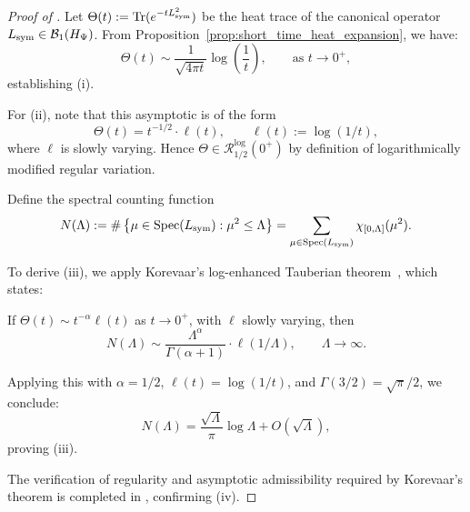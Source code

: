 \begin{proof}[Proof of ]
Let \( \Theta(t) := \operatorname{Tr}(e^{-t L_{\mathrm{sym}}^2}) \) be the heat trace of the canonical operator \( L_{\mathrm{sym}} \in \mathcal{B}_1(H_{\Psi}) \). From Proposition~\ref{prop:short_time_heat_expansion}, we have:
\[
\Theta(t) \sim \frac{1}{\sqrt{4\pi t}} \log\left( \frac{1}{t} \right), \qquad \text{as } t \to 0^+,
\]
establishing (i).

\medskip

For (ii), note that this asymptotic is of the form
\[
\Theta(t) = t^{-1/2} \cdot \ell(t), \qquad \ell(t) := \log(1/t),
\]
where \( \ell \) is slowly varying. Hence \( \Theta \in \mathcal{R}^{\log}_{1/2}(0^+) \) by definition of logarithmically modified regular variation.

\medskip

Define the spectral counting function
\[
N(\Lambda) := \#\left\{ \mu \in \operatorname{Spec}(L_{\mathrm{sym}}) : \mu^2 \le \Lambda \right\}
= \sum_{\mu \in \operatorname{Spec}(L_{\mathrm{sym}})} \chi_{[0, \Lambda]}(\mu^2).
\]

\medskip

To derive (iii), we apply Korevaar’s log-enhanced Tauberian theorem~\cite[Ch.~III, Thm. 5.1]{Korevaar2004Tauberian}, which states:

If \( \Theta(t) \sim t^{-\alpha} \ell(t) \) as \( t \to 0^+ \), with \( \ell \) slowly varying, then
\[
N(\Lambda) \sim \frac{\Lambda^\alpha}{\Gamma(\alpha + 1)} \cdot \ell(1/\Lambda), \qquad \Lambda \to \infty.
\]

\medskip

Applying this with \( \alpha = 1/2 \), \( \ell(t) = \log(1/t) \), and \( \Gamma(3/2) = \sqrt{\pi}/2 \), we conclude:
\[
N(\Lambda) = \frac{\sqrt{\Lambda}}{\pi} \log \Lambda + O(\sqrt{\Lambda}),
\]
proving (iii).

\medskip

The verification of regularity and asymptotic admissibility required by Korevaar’s theorem is completed in , confirming (iv).
\end{proof}
